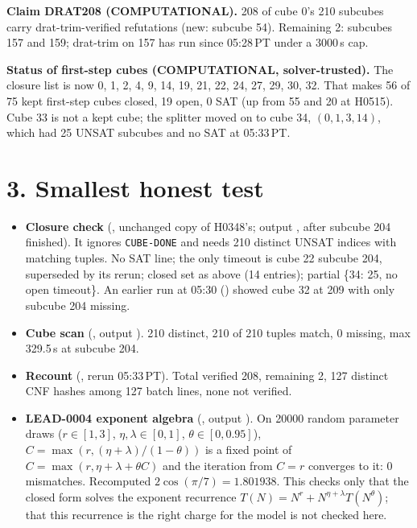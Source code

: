 \documentclass[11pt]{article}
\begin{document}
\textbf{Claim DRAT208 (COMPUTATIONAL).} 208 of cube 0's 210 subcubes carry drat-trim-verified refutations (new: subcube 54). Remaining 2: subcubes 157 and 159; drat-trim on 157 has run since 05:28\,PT under a 3000\,s cap.

\textbf{Status of first-step cubes (COMPUTATIONAL, solver-trusted).} The closure list is now 0, 1, 2, 4, 9, 14, 19, 21, 22, 24, 27, 29, 30, 32. That makes 56 of 75 kept first-step cubes closed, 19 open, 0 SAT (up from 55 and 20 at H0515). Cube 33 is not a kept cube; the splitter moved on to cube 34, $(0,1,3,14)$, which had 25 UNSAT subcubes and no SAT at 05:33\,PT.

\section*{3. Smallest honest test}
\begin{itemize}
\item \textbf{Closure check} (, unchanged copy of H0348's; output , after subcube 204 finished). It ignores \texttt{CUBE-DONE} and needs 210 distinct UNSAT indices with matching tuples. No SAT line; the only timeout is cube 22 subcube 204, superseded by its rerun; closed set as above (14 entries); partial \{34: 25, no open timeout\}. An earlier run at 05:30 () showed cube 32 at 209 with only subcube 204 missing.
\item \textbf{Cube scan} (, output ). 210 distinct, 210 of 210 tuples match, 0 missing, max 329.5\,s at subcube 204.
\item \textbf{Recount} (, rerun 05:33\,PT). Total verified 208, remaining 2, 127 distinct CNF hashes among 127 batch lines, none not verified.
\item \textbf{LEAD-0004 exponent algebra} (, output ). On 20000 random parameter draws ($r\in[1,3]$, $\eta,\lambda\in[0,1]$, $\theta\in[0,0.95]$), $C=\max(r,(\eta+\lambda)/(1-\theta))$ is a fixed point of $C=\max(r,\eta+\lambda+\theta C)$ and the iteration from $C=r$ converges to it: 0 mismatches. Recomputed $2\cos(\pi/7)=1.801938$. This checks only that the closed form solves the exponent recurrence $T(N)=N^r+N^{\eta+\lambda}T(N^\theta)$; that this recurrence is the right charge for the model is not checked here.
\end{itemize}
\end{document}
